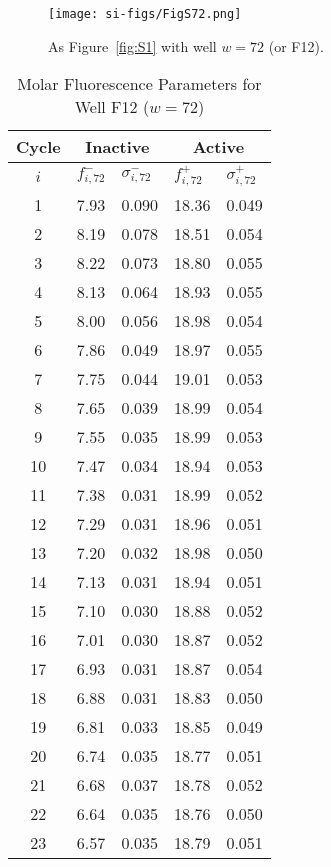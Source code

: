                 \begin{figure}
                    \centering
                    \texttt{[image: si-figs/FigS72.png]}
                    \caption{
                        As Figure~\ref{fig:S1} with well $w=72$ (or F12).
                    }
                \end{figure}
                \clearpage
    \begin{table}
        \caption{Molar Fluorescence Parameters for Well F12 ($w=72$)}
        \centering
        \begin{tabular}{c|ll|ll}
            Cycle & \multicolumn{2}{c|}{Inactive} & \multicolumn{2}{c}{Active} \\
            \hline
            $i$ & $f_{i,72}^{-}$ & $\sigma_{i,72}^{-}$ &  $f_{i,72}^{+}$ & $\sigma_{i,72}^{+}$ \\
            \hline
    1 & 7.93 & 0.090 & 18.36 & 0.049 \\
2 & 8.19 & 0.078 & 18.51 & 0.054 \\
3 & 8.22 & 0.073 & 18.80 & 0.055 \\
4 & 8.13 & 0.064 & 18.93 & 0.055 \\
5 & 8.00 & 0.056 & 18.98 & 0.054 \\
6 & 7.86 & 0.049 & 18.97 & 0.055 \\
7 & 7.75 & 0.044 & 19.01 & 0.053 \\
8 & 7.65 & 0.039 & 18.99 & 0.054 \\
9 & 7.55 & 0.035 & 18.99 & 0.053 \\
10 & 7.47 & 0.034 & 18.94 & 0.053 \\
11 & 7.38 & 0.031 & 18.99 & 0.052 \\
12 & 7.29 & 0.031 & 18.96 & 0.051 \\
13 & 7.20 & 0.032 & 18.98 & 0.050 \\
14 & 7.13 & 0.031 & 18.94 & 0.051 \\
15 & 7.10 & 0.030 & 18.88 & 0.052 \\
16 & 7.01 & 0.030 & 18.87 & 0.052 \\
17 & 6.93 & 0.031 & 18.87 & 0.054 \\
18 & 6.88 & 0.031 & 18.83 & 0.050 \\
19 & 6.81 & 0.033 & 18.85 & 0.049 \\
20 & 6.74 & 0.035 & 18.77 & 0.051 \\
21 & 6.68 & 0.037 & 18.78 & 0.052 \\
22 & 6.64 & 0.035 & 18.76 & 0.050 \\
23 & 6.57 & 0.035 & 18.79 & 0.051 \\

\end{tabular}
\end{table}
